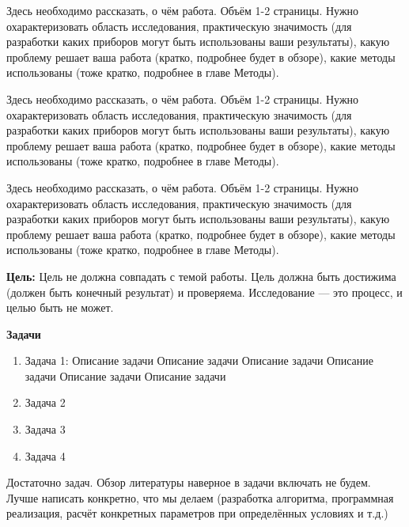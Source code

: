 \documentclass[a4paper,14pt]{extarticle}
\begin{document}


\tableofcontents
\pagebreak


Здесь необходимо рассказать, о чём работа. Объём 1-2 страницы. Нужно охарактеризовать область исследования, практическую значимость (для разработки каких приборов могут быть использованы ваши результаты), какую проблему решает ваша работа (кратко, подробнее будет в обзоре), какие методы использованы (тоже кратко, подробнее в главе Методы).

Здесь необходимо рассказать, о чём работа. Объём 1-2 страницы. Нужно охарактеризовать область исследования, практическую значимость (для разработки каких приборов могут быть использованы ваши результаты), какую проблему решает ваша работа (кратко, подробнее будет в обзоре), какие методы использованы (тоже кратко, подробнее в главе Методы).

Здесь необходимо рассказать, о чём работа. Объём 1-2 страницы. Нужно охарактеризовать область исследования, практическую значимость (для разработки каких приборов могут быть использованы ваши результаты), какую проблему решает ваша работа (кратко, подробнее будет в обзоре), какие методы использованы (тоже кратко, подробнее в главе Методы).

\label{Tasks}

\textbf{Цель:} Цель не должна совпадать с темой работы. Цель должна быть достижима (должен быть конечный результат) и проверяема. Исследование --- это процесс, и целью быть не может.

\textbf{Задачи}
\begin{enumerate}
    \item {
          Задача 1: Описание задачи Описание задачи Описание задачи Описание задачи Описание задачи Описание задачи
          }
    \item Задача 2
    \item Задача 3
    \item Задача 4
\end{enumerate}

Достаточно задач. Обзор литературы наверное в задачи включать не будем. Лучше написать конкретно, что мы делаем (разработка алгоритма, программная реализация, расчёт конкретных параметров при определённых условиях и т.д.)
\end{document}
